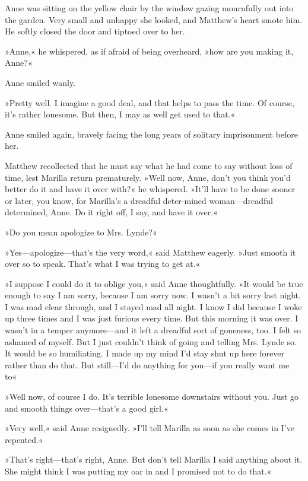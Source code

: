 Anne was sitting on the yellow chair by the window gazing mournfully out into the garden. Very small and unhappy she looked, and Matthew’s heart smote him. He softly closed the door and tiptoed over to her.

»Anne,« he whispered, as if afraid of being overheard, »how are you making it, Anne?«

Anne smiled wanly.

»Pretty well. I imagine a good deal, and that helps to pass the time. Of course, it’s rather lonesome. But then, I may as well get used to that.«

Anne smiled again, bravely facing the long years of solitary imprisonment before her.

Matthew recollected that he must say what he had come to say without loss of time, lest Marilla return prematurely. »Well now, Anne, don’t you think you’d better do it and have it over with?« he whispered. »It’ll have to be done sooner or later, you know, for Marilla’s a dreadful deter-mined woman—dreadful determined, Anne. Do it right off, I say, and have it over.«

»Do you mean apologize to Mrs. Lynde?«

»Yes—apologize—that’s the very word,« said Matthew eagerly. »Just smooth it over so to speak. That’s what I was trying to get at.«

»I suppose I could do it to oblige you,« said Anne thoughtfully. »It would be true enough to say I am sorry, because I am sorry now. I wasn’t a bit sorry last night. I was mad clear through, and I stayed mad all night. I know I did because I woke up three times and I was just furious every time. But this morning it was over. I wasn’t in a temper anymore—and it left a dreadful sort of goneness, too. I felt so ashamed of myself. But I just couldn’t think of going and telling Mrs. Lynde so. It would be so humiliating. I made up my mind I’d stay shut up here forever rather than do that. But still—I’d do anything for you—if you really want me to\longdash«

»Well now, of course I do. It’s terrible lonesome downstairs without you. Just go and smooth things over—that’s a good girl.«

»Very well,« said Anne resignedly. »I’ll tell Marilla as soon as she comes in I’ve repented.«

»That’s right—that’s right, Anne. But don’t tell Marilla I said anything about it. She might think I was putting my oar in and I promised not to do that.«

